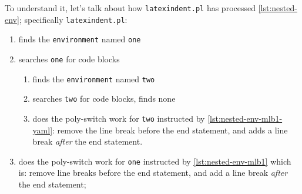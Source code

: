  To understand it, let's talk about how \texttt{latexindent.pl} has processed
 \cref{lst:nested-env}; specifically \texttt{latexindent.pl}:
 \begin{enumerate}
  \item finds the \texttt{environment} named \texttt{one}
  \item   searches \texttt{one} for code blocks
        \begin{enumerate}
         \item finds the \texttt{environment} named \texttt{two}
         \item searches \texttt{two} for code blocks, finds none
         \item does the poly-switch work for \texttt{two} instructed by
               \cref{lst:nested-env-mlb1-yaml}: remove the line break before the end
               statement, and adds a line break \emph{after} the end statement.
        \end{enumerate}
  \item does the poly-switch work for \texttt{one} instructed by
        \cref{lst:nested-env-mlb1} which is: remove line breaks before the end statement,
        and add a line break \emph{after} the end statement;
 \end{enumerate}

